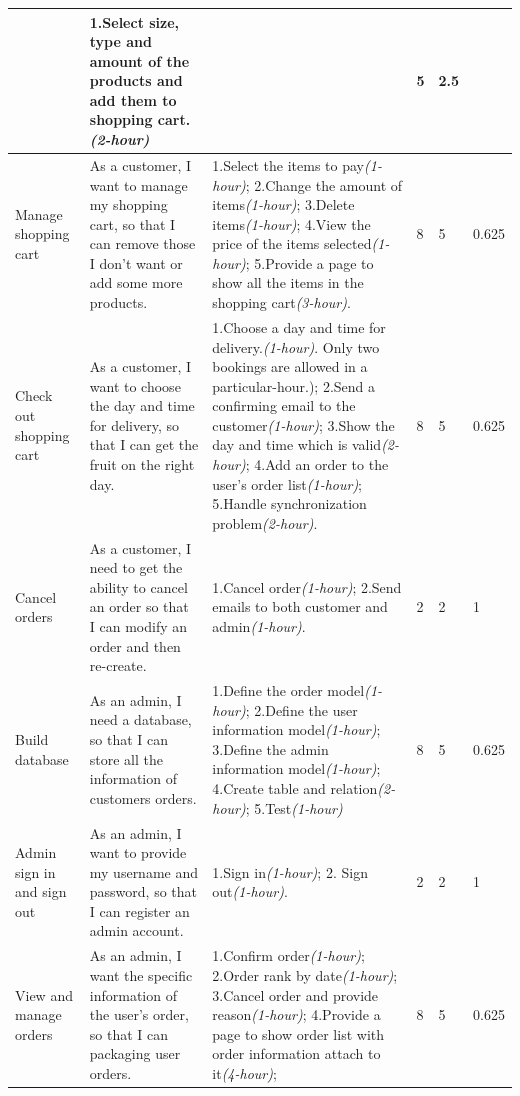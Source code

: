 \documentclass{report}
\begin{document}
\begin{tabularx}{\linewidth}{%
  >{\raggedright\arraybackslash}p{1.5cm}%
  >{\raggedright\arraybackslash}X%
  >{\raggedright\arraybackslash}X%
  p{1cm}p{1cm}p{1cm}
  }
  & 1.Select size, type and amount of the products and add them to shopping cart.\textit{(2-hour)}
  & 2
  & 5
  & 2.5
  \\
  \midrule
  Manage shopping cart
  & As a customer, I want to manage my shopping cart, so that I can remove those I don't want or add some more products.
  & 1.Select the items to pay\textit{(1-hour)}; 2.Change the amount of items\textit{(1-hour)}; 3.Delete items\textit{(1-hour)}; 4.View the price of the items selected\textit{(1-hour)}; 5.Provide a page to show all the items in the shopping cart\textit{(3-hour)}.
  & 8
  & 5
  & 0.625
  \\
  \midrule
  Check out shopping cart
  & As a customer, I want to choose the day and time for delivery, so that I can get the fruit on the right day.
  & 1.Choose a day and time for delivery.\textit{(1-hour)}. Only two bookings are allowed in a particular-hour.); 2.Send a confirming email to the customer\textit{(1-hour)}; 3.Show the day and time which is valid\textit{(2-hour)}; 4.Add an order to the user's order list\textit{(1-hour)}; 5.Handle synchronization problem\textit{(2-hour)}.
  & 8
  & 5
  & 0.625
  \\
  \midrule
  Cancel orders
  & As a customer, I need to get the ability to cancel an order so that I can modify an order and then re-create.
  & 1.Cancel order\textit{(1-hour)}; 2.Send emails to both customer and admin\textit{(1-hour)}.
  & 2
  & 2
  & 1
  \\
  \midrule
  Build database
  & As an admin, I need a database, so that I can store all the information of customers orders.
  & 1.Define the order model\textit{(1-hour)}; 2.Define the user information model\textit{(1-hour)}; 3.Define the admin information model\textit{(1-hour)}; 4.Create table and relation\textit{(2-hour)}; 5.Test\textit{(1-hour)}
  & 8
  & 5
  & 0.625
  \\
  \midrule
  Admin sign in and sign out
  & As an admin, I want to provide my username and password, so that I can register an admin account.
  & 1.Sign in\textit{(1-hour)}; 2. Sign out\textit{(1-hour)}.
  & 2
  & 2
  & 1
  \\
  \midrule
  View and manage orders
  & As an admin, I want the specific information of the user's order, so that I can packaging user orders.
  & 1.Confirm order\textit{(1-hour)}; 2.Order rank by date\textit{(1-hour)}; 3.Cancel order and provide reason\textit{(1-hour)}; 4.Provide a page to show order list with order information attach to it\textit{(4-hour)};
  & 8
  & 5
  & 0.625
  \\

\end{tabularx}
\end{document}
